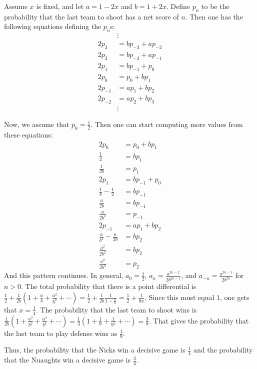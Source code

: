 \documentclass[11pt]{article}
\theoremstyle{definition}
\begin{document}
Assume $x$ is fixed, and let $a = 1-2x$ and $b = 1 + 2x$.  Define $p_n$ to be the probability that the last team to shoot has a net score of $n$.  Then one has the following equations defining the $p_n$s:
\begin{align*}
&  \vdots \\
2p_3 & = bp_{-3} + ap_{-2} \\
2p_2 & = bp_{-2} + ap_{-1} \\
2p_1 & = bp_{-1} + p_0 \\
2p_0 & = p_{0} + bp_{1} \\
2p_{-1} & = ap_1 + bp_2 \\
2p_{-2} & = ap_2 + bp_3 \\
& \vdots
\end{align*}

Now, we assume that $p_0 = \frac{1}{2}$.  Then one can start computing more values from these equations:
\begin{align*}
2p_0 & = p_0 + bp_1 \\
\frac{1}{2} & = bp_1 \\
\frac{1}{2b} & = p_1 \\
2p_1 & = bp_{-1} + p_0 \\
\frac{1}{b} - \frac{1}{2} & = bp_{-1} \\
\frac{a}{2b} & = bp_{-1} \\
\frac{a}{2b^2} & = p_{-1} \\
2p_{-1} & = ap_1 + bp_2 \\
\frac{a}{b^2}-\frac{a}{2b} & = bp_2 \\
\frac{a^2}{2b^2} & = bp_2 \\
\frac{a^2}{2b^3} & = p_2
\end{align*}
And this pattern continues.  In general, $a_0 = \frac{1}{2}$, $a_n = \frac{a^{2n-2}}{2b^{2n-1}}$, and $a_{-n} = \frac{a^{2n-1}}{2b^{2n}}$ for $n > 0$.  The total probability that there is a point differential is $\frac{1}{2} + \frac{1}{2b}\left(1 + \frac{a}{b} + \frac{a^2}{b^2} + \cdots\right) = \frac{1}{2} + \frac{1}{2b}\frac{1}{1-\frac{a}{b}} = \frac{1}{2} + \frac{1}{8x}$.  Since this must equal $1$, one gets that $x = \frac{1}{4}$.  The probability that the last team to shoot wins is $\frac{1}{2b}\left(1 + \frac{a^2}{b^2} + \frac{a^4}{b^4} + \cdots\right) = \frac{1}{3}\left(1 + \frac{1}{9} + \frac{1}{9^2} + \cdots\right) = \frac{3}{8}$.  That gives the probability that the last team to play defense wins as $\frac{1}{8}$.

Thus, the probability that the Nicks win a decisive game is $\frac{1}{4}$ and the probability that the Nuaughts win a decisive game is $\frac{3}{4}$.
\end{document}
